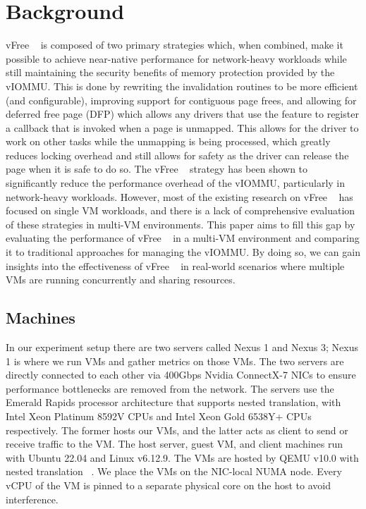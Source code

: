 \section{Background}
\label{sec:background}

vFree ~\cite{vFree} is composed of two primary strategies which, when combined, make it possible to achieve near-native performance for network-heavy workloads while still maintaining the security benefits of memory protection provided by the vIOMMU. This is done by rewriting the invalidation routines to be more efficient (and configurable), improving support for contiguous page frees, and allowing for deferred free page (DFP) which allows any drivers that use the feature to register a callback that is invoked when a page is unmapped. This allows for the driver to work on other tasks while the unmapping is being processed, which greatly reduces locking overhead and still allows for safety as the driver can release the page when it is safe to do so. The vFree ~\cite{vFree} strategy has been shown to significantly reduce the performance overhead of the vIOMMU, particularly in network-heavy workloads. However, most of the existing research on vFree ~\cite{vFree} has focused on single VM workloads, and there is a lack of comprehensive evaluation of these strategies in multi-VM environments. This paper aims to fill this gap by evaluating the performance of vFree ~\cite{vFree} in a multi-VM environment and comparing it to traditional approaches for managing the vIOMMU. By doing so, we can gain insights into the effectiveness of vFree ~\cite{vFree} in real-world scenarios where multiple VMs are running concurrently and sharing resources.

\subsection{Machines}
\label{subsec:back_bench}
In our experiment setup there are two servers called Nexus 1 and Nexus 3; Nexus 1 is where we run VMs and gather metrics on those VMs. The two servers are directly connected to each other via 400Gbps Nvidia ConnectX-7 NICs to ensure performance bottlenecks are removed from the network. The servers use the Emerald Rapids processor architecture that supports nested translation, with Intel Xeon Platinum 8592V CPUs and Intel Xeon Gold 6538Y+ CPUs respectively. The former hosts our VMs, and the latter acts as client to send or receive traffic to the VM. The host server, guest VM, and client machines run with Ubuntu 22.04 and Linux v6.12.9. The VMs are hosted by QEMU v10.0 with nested translation ~\cite{yiliu1765qemu}. We place the VMs on the NIC-local NUMA node. Every vCPU of the VM is pinned to a separate physical core on the host to avoid interference. 

